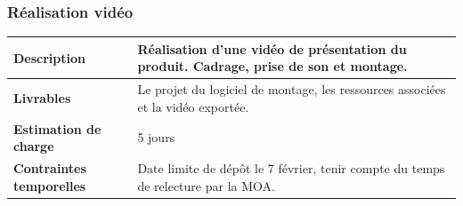 \subsubsection{Réalisation vidéo}

\begin{tabularx}{13cm}{lX}
    \toprule
        \textbf{Description} &
        Réalisation d'une vidéo de présentation du produit. Cadrage, prise de son et montage. \\
    \midrule
        \textbf{Livrables} &
        Le projet du logiciel de montage, les ressources associées et la vidéo exportée. \\
    \midrule
        \textbf{Estimation de charge} &
        5 jours \\
    \midrule
        \textbf{Contraintes temporelles} &
        Date limite de dépôt le 7 février, tenir compte du temps de relecture par la MOA. \\
    \bottomrule
\end{tabularx}




